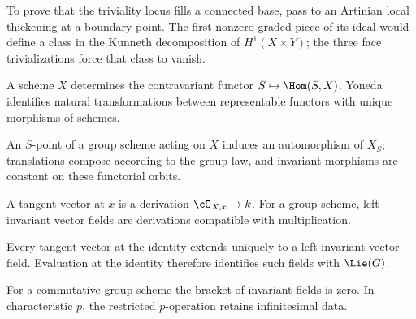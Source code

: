 \begin{lemma}
\label{mumford3-complete-connected-local-argument}
To prove that the triviality locus fills a connected base, pass to an Artinian
local thickening at a boundary point.  The first nonzero graded piece of its
ideal would define a class in the Kunneth decomposition of $H^1(X\times Y)$;
the three face trivializations force that class to vanish.
\notready
\end{lemma}

\begin{definition}
\label{mumford3-functor-of-points}
A scheme $X$ determines the contravariant functor $S\mapsto\Hom(S,X)$.
Yoneda identifies natural transformations between representable functors with
unique morphisms of schemes.
\notready
\end{definition}

\begin{definition}
\label{mumford3-translations-and-actions}
An $S$-point of a group scheme acting on $X$ induces an automorphism of $X_S$;
translations compose according to the group law, and invariant morphisms are
constant on these functorial orbits.
\notready
\end{definition}

\begin{definition}
\label{mumford3-tangent-space-and-vector-field}
A tangent vector at $x$ is a derivation $\cO_{X,x}\to k$.  For a group scheme,
left-invariant vector fields are derivations compatible with multiplication.
\notready
\end{definition}

\begin{proposition}
\label{mumford3-invariant-field-extension}
Every tangent vector at the identity extends uniquely to a left-invariant
vector field.  Evaluation at the identity therefore identifies such fields
with $\Lie(G)$.
\notready
\end{proposition}

\begin{proposition}
\label{mumford3-commutative-lie-algebra}
For a commutative group scheme the bracket of invariant fields is zero.  In
characteristic $p$, the restricted $p$-operation retains infinitesimal data.
\notready
\end{proposition}

